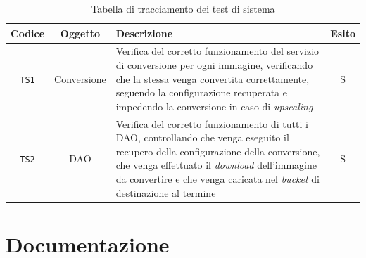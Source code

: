 \begin{table}[H]
    \caption{Tabella di tracciamento dei test di sistema}
    \label{tab:test-sistema}
    \begin{tabularx}{\textwidth}{|c|c|X|c|}
        \hline
        \textbf{Codice}                                      & \textbf{Oggetto} & \textbf{Descrizione}                           & \textbf{Esito} \\
        \hline
        \verb|TS1|                                           & Conversione      & Verifica del corretto funzionamento
        del servizio di conversione per ogni immagine, verificando che la stessa
        venga convertita correttamente, seguendo la configurazione recuperata e
        impedendo la conversione in caso di \emph{upscaling} & S
        \\
        \hline
        \verb|TS2|                                           & DAO              & Verifica del corretto funzionamento di tutti i
        DAO, controllando che venga eseguito il recupero della configurazione della
        conversione, che venga effettuato il \emph{download} dell'immagine da
        convertire e che venga caricata nel \emph{bucket} di destinazione al termine
                                                             & S
        \\
        \hline
    \end{tabularx}
\end{table}

\section{Documentazione}

